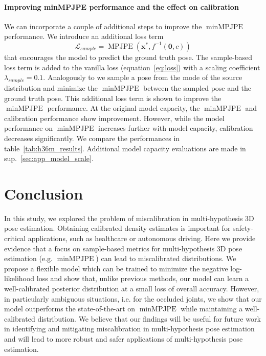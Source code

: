 \documentclass{article} \usepackage{iclr2023_conference,times}
\def\eqref#1{equation~\ref{#1}}
\def\vx{{\bm{x}}}
\begin{document}
\paragraph{Improving minMPJPE performance and the effect on calibration}
We can incorporate a couple of additional steps to improve the $\operatorname{minMPJPE}$ performance.
We introduce an additional loss term 
\begin{equation*}
    \mathcal{L}_{sample} = \operatorname{MPJPE}\left(\vx^*, f^{-1}(\mathbf{0}, c)\right)
\end{equation*} 
that encourages the model to predict the ground truth pose.
The sample-based loss term is added to the vanilla loss (\eqref{eq:loss}) with a scaling coefficient $\lambda_{sample} = 0.1$. Analogously to \citet{kolotouros2021} we sample a pose from the mode of the source distribution and minimize the $\operatorname{minMPJPE}$ between the sampled pose and the ground truth pose.
This additional loss term is shown to improve the $\operatorname{minMPJPE}$ performance. At the original model capacity, the $\operatorname{minMPJPE}$ and calibration performance show improvement.
However, while the model performance on $\operatorname{minMPJPE}$ increases further with model capacity, calibration decreases significantly.
We compare the performances in table~\ref{tab:h36m_results}.
Additional model capacity evaluations are made in sup.~\ref{sec:app_model_scale}.

\section{Conclusion}
    In this study, we explored the problem of miscalibration in multi-hypothesis 3D pose estimation.
    Obtaining calibrated density estimates is important for safety-critical applications, such as healthcare or autonomous driving.
    Here we provide evidence that a focus on sample-based metrics for multi-hypothesis 3D pose estimation (e.g. $\operatorname{minMPJPE}$) can lead to miscalibrated distributions.
    We propose a flexible model which can be trained to minimize the negative log-likelihood loss and
    show that, unlike previous methods, our model can learn a well-calibrated posterior distribution at a small loss of overall accuracy.
    However, in particularly ambiguous situations, i.e. for the occluded joints, we show that our model outperforms the state-of-the-art on $\operatorname{minMPJPE}$ while maintaining a well-calibrated distribution.
    We believe that our findings will be useful for future work in identifying and mitigating miscalibration in multi-hypothesis pose estimation and will lead to more robust and safer applications of multi-hypothesis pose estimation.
\end{document}
